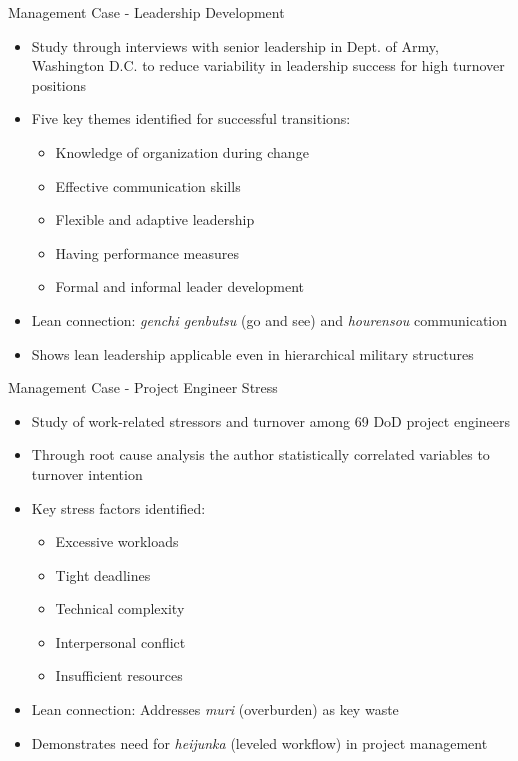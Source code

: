 \documentclass[aspectratio=169,11pt,xcolor={dvipsnames},hyperref={pdftex,pdfpagemode=UseNone,hidelinks,pdfdisplaydoctitle=true},usepdftitle=false]{beamer}
\begin{document}
    \begin{frame}{Management Case - Leadership Development \cite{McCants2024}}
      \begin{itemize}
        \item Study through interviews with senior leadership in Dept. of Army, Washington D.C. to reduce variability in leadership success for high turnover positions
        \item Five key themes identified for successful transitions:
          \begin{itemize}
            \item Knowledge of organization during change
            \item Effective communication skills
            \item Flexible and adaptive leadership
            \item Having performance measures
            \item Formal and informal leader development
          \end{itemize}
        \item Lean connection: \textit{genchi genbutsu} (go and see) and \textit{hourensou} communication
        \item Shows lean leadership applicable even in hierarchical military structures
      \end{itemize}
    \end{frame}

    \begin{frame}{Management Case - Project Engineer Stress \cite{Turner2024}}
      \begin{itemize}
        \item Study of work-related stressors and turnover among 69 DoD project engineers
        \item Through root cause analysis the author statistically correlated variables to turnover intention
        \item Key stress factors identified:
          \begin{itemize}
            \item Excessive workloads
            \item Tight deadlines
            \item Technical complexity
            \item Interpersonal conflict
            \item Insufficient resources
          \end{itemize}
        \item Lean connection: Addresses \textit{muri} (overburden) as key waste
        \item Demonstrates need for \textit{heijunka} (leveled workflow) in project management
      \end{itemize}
    \end{frame}
\end{document}
